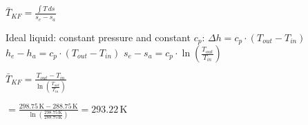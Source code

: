 \( \bar{T}_{KF} = \frac{\int T \, ds}{s_e - s_a} \)  

Ideal liquid: constant pressure and constant \( c_p \):  
\( \Delta h = c_p \cdot (T_{out} - T_{in}) \)  
\( h_e - h_a = c_p \cdot (T_{out} - T_{in}) \)  
\( s_e - s_a = c_p \cdot \ln \left( \frac{T_{out}}{T_{in}} \right) \)  

\( \bar{T}_{KF} = \frac{T_{out} - T_{in}}{\ln \left( \frac{T_{out}}{T_{in}} \right)} \)  

\( = \frac{298.75 \, \text{K} - 288.75 \, \text{K}}{\ln \left( \frac{298.75 \, \text{K}}{288.75 \, \text{K}} \right)} = 293.22 \, \text{K} \)